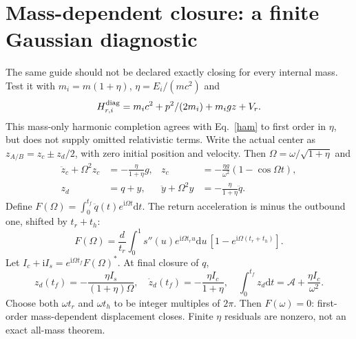 \documentclass[11pt,a4paper]{article}
\newcommand{\dd}{\mathrm d}
\newcommand{\ii}{\mathrm i}
\begin{document}
\section{Mass-dependent closure: a finite Gaussian diagnostic}
The same guide should not be declared exactly closing for every internal
mass. Test it with $m_i=m(1+\eta)$, $\eta=E_i/(mc^2)$ and
\begin{equation}
 H_{r,i}^{\rm diag}=m_i c^2+p^2/(2m_i)+m_i gz+V_r .\label{massdiag}
\end{equation}
This mass-only harmonic completion agrees with Eq.~\eqref{ham} to first
order in $\eta$, but does not supply omitted relativistic terms.
Write the actual center as $z_{A/B}=z_c\pm z_d/2$, with zero initial
position and velocity. Then $\Omega=\omega/\sqrt{1+\eta}$ and
\begin{align}
 \ddot z_c+\Omega^2z_c&=-\frac{\eta}{1+\eta}g,&
 z_c&=-\frac{\eta g}{\omega^2}(1-\cos\Omega t),\\
 z_d&=q+y,&
 \ddot y+\Omega^2y&=-\frac{\eta}{1+\eta}\ddot q .
\end{align}
Define $F(\Omega)=\int_0^{t_f}\ddot q(t)e^{\ii\Omega t}\dd t$.
The return acceleration is minus the outbound one, shifted by $t_r+t_h$:
\begin{equation}
 F(\Omega)=\frac d{t_r}
 \int_0^1s''(u)e^{\ii\Omega t_ru}\dd u\,
 [1-e^{\ii\Omega(t_r+t_h)}].\label{fourier}
\end{equation}
Let $I_c+\ii I_s=e^{\ii\Omega t_f}F(\Omega)^*$. At final closure of $q$,
\begin{equation}
 z_d(t_f)=-\frac{\eta I_s}{(1+\eta)\Omega},\quad
 \dot z_d(t_f)=-\frac{\eta I_c}{1+\eta},\quad
 \int_0^{t_f}z_d\dd t=\mathcal A+\frac{\eta I_c}{\omega^2}.
\end{equation}
Choose both $\omega t_r$ and $\omega t_h$ to be integer multiples of
$2\pi$. Then $F(\omega)=0$: first-order mass-dependent displacement
closes. Finite $\eta$ residuals are nonzero, not an exact all-mass theorem.
\end{document}
